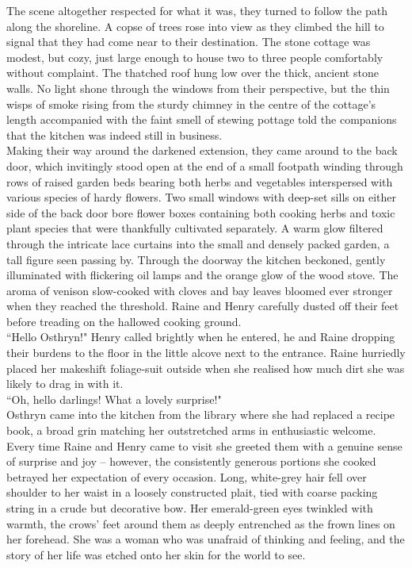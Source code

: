 The scene altogether respected for what it was, they turned to follow the path along the shoreline. 
A copse of trees rose into view as they climbed the hill to signal that they had come near to their destination.
The stone cottage was modest, but cozy, just large enough to house two to three people comfortably without complaint.
The thatched roof hung low over the thick, ancient stone walls.
No light shone through the windows from their perspective, but the thin wisps of smoke rising from the sturdy chimney in the centre of the cottage's length accompanied with the faint smell of stewing pottage told the companions that the kitchen was indeed still in business.\\

Making their way around the darkened extension, they came around to the back door, which invitingly stood open at the end of a small footpath winding through rows of raised garden beds bearing both herbs and vegetables interspersed with various species of hardy flowers.
Two small windows with deep-set sills on either side of the back door bore flower boxes containing both cooking herbs and toxic plant species that were thankfully cultivated separately.
A warm glow filtered through the intricate lace curtains into the small and densely packed garden, a tall figure seen passing by.
Through the doorway the kitchen beckoned, gently illuminated with flickering oil lamps and the orange glow of the wood stove.
The aroma of venison slow-cooked with cloves and bay leaves bloomed ever stronger when they reached the threshold.
Raine and Henry carefully dusted off their feet before treading on the hallowed cooking ground.\\

``Hello Osthryn!" Henry called brightly when he entered, he and Raine dropping their burdens to the floor in the little alcove next to the entrance. 
Raine hurriedly placed her makeshift foliage-suit outside when she realised how much dirt she was likely to drag in with it.\\

``Oh, hello darlings! What a lovely surprise!"\\
Osthryn came into the kitchen from the library where she had replaced a recipe book, a broad grin matching her outstretched arms in enthusiastic welcome.
Every time Raine and Henry came to visit she greeted them with a genuine sense of surprise and joy -- however, the consistently generous portions she cooked betrayed her expectation of every occasion.
Long, white-grey hair fell over shoulder to her waist in a loosely constructed plait, tied with coarse packing string in a crude but decorative bow.
Her emerald-green eyes twinkled with warmth, the crows' feet around them as deeply entrenched as the frown lines on her forehead.
She was a woman who was unafraid of thinking and feeling, and the story of her life was etched onto her skin for the world to see.\\


